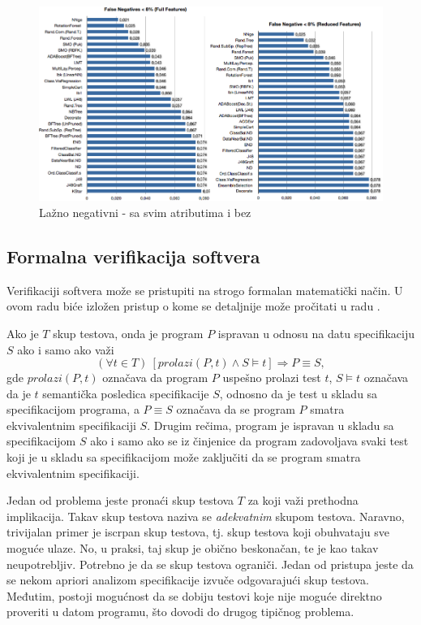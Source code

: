 \documentclass[a4paper]{article}
\theoremstyle{definition}
\begin{document}
{\begin{figure}[h!]
\centering
\includegraphics[width=\textwidth]{false_negative.png}
\caption{Lažno negativni - sa svim atributima i bez}
\label{fig:falseNeg}
\end{figure}

\subsection{Formalna verifikacija softvera}

\par Verifikaciji softvera može se pristupiti na strogo formalan matematički način. U ovom radu biće izložen pristup o kome se detaljnije može pročitati u radu \cite{verify}.

\par Ako je $T$ skup testova, onda je program $P$ ispravan u odnosu na datu specifikaciju $S$ ako i samo ako važi
$$(\forall t\in T)\ [prolazi(P,t)\wedge S\models t]\Rightarrow P\equiv S,$$
gde $prolazi(P,t)$ označava da program $P$ uspešno prolazi test $t$, $S\models t$ označava da je $t$ semantička posledica specifikacije $S$, odnosno da je test u skladu sa specifikacijom programa, a $P\equiv S$ označava da se program $P$ smatra ekvivalentnim specifikaciji $S$. Drugim rečima, program je ispravan u skladu sa specifikacijom $S$ ako i samo ako se iz činjenice da program zadovoljava svaki test koji je u skladu sa specifikacijom može zaključiti da se program smatra ekvivalentnim specifikaciji.

\par Jedan od problema jeste pronaći skup testova $T$ za koji važi prethodna implikacija. Takav skup testova naziva se \emph{adekvatnim} skupom testova. Naravno, trivijalan primer je iscrpan skup testova, tj. skup testova koji obuhvataju sve moguće ulaze. No, u praksi, taj skup je obično beskonačan, te je kao takav neupotrebljiv. Potrebno je da se skup testova ograniči. Jedan od pristupa jeste da se nekom apriori analizom specifikacije izvuče odgovarajući skup testova. Međutim, postoji mogućnost da se dobiju testovi koje nije moguće direktno proveriti u datom programu, što dovodi do drugog tipičnog problema.

}
\end{document}
